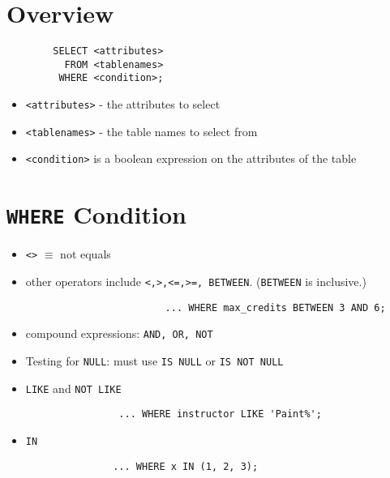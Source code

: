 \documentclass{cheatsheet}
\begin{document}
\begin{multicols*}{2}
    \section{Overview}
    \begin{verbatim}
        SELECT <attributes>
          FROM <tablenames>
         WHERE <condition>;
    \end{verbatim}

    \begin{itemize}
        \item \texttt{<attributes>} - the attributes to select
        \item \texttt{<tablenames>} - the table names to select from
        \item \texttt{<condition>} is a boolean expression on the attributes of
            the table

    \end{itemize}

    \section{\texttt{WHERE} Condition}
    \begin{itemize}
        \item \texttt{<>} $\equiv$ not equals

        \item other operators include \texttt{<,>,<=,>=, BETWEEN}.
            (\texttt{BETWEEN} is inclusive.)
            \begin{verbatim}
                        ... WHERE max_credits BETWEEN 3 AND 6;
            \end{verbatim}

        \item compound expressions: \texttt{AND, OR, NOT}

        \item Testing for \texttt{NULL}: must use \texttt{IS NULL} or
            \texttt{IS NOT NULL}

        \item \texttt{LIKE} and \texttt{NOT LIKE}
            \begin{verbatim}
                ... WHERE instructor LIKE 'Paint%';
            \end{verbatim}

        \item \texttt{IN}
            \begin{verbatim}
               ... WHERE x IN (1, 2, 3);
            \end{verbatim}
    \end{itemize}


\end{multicols*}
\end{document}
